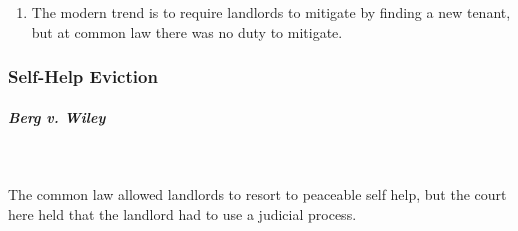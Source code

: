 \begin{enumerate}
    \item The modern trend is to require landlords to mitigate by finding a 
    new tenant, but at common law there was no duty to mitigate.
\end{enumerate}

\subsubsection{Self-Help Eviction}

\paragraph{\emph{Berg v. Wiley}}
~\\\\
The common law allowed landlords to resort to peaceable self help, but the 
court here held that the landlord had to use a judicial process.

